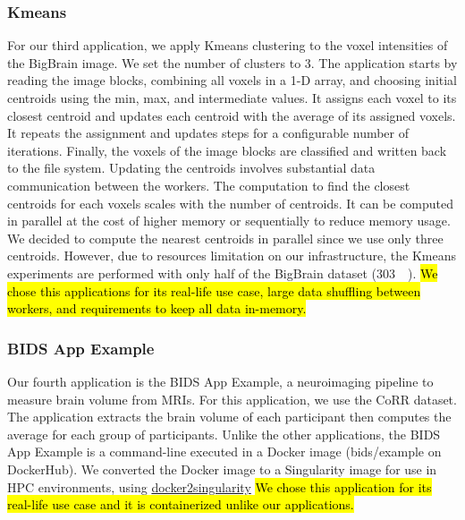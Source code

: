 \documentclass[AMA,STIX1COL]{WileyNJD-v2}
\newcommand{\HL}[1]{\hl{#1}}
\begin{document}
\subsubsection{Kmeans}
For our third application, we apply Kmeans clustering to the voxel
intensities of the BigBrain image. We set the number of clusters to 3. The
application starts by reading the image blocks, combining all voxels in a
1-D array, and choosing initial centroids using the min, max, and
intermediate values. It assigns each voxel to its closest centroid and
updates each centroid with the average of its assigned voxels. It repeats
the assignment and updates steps for a configurable number of iterations.
Finally, the voxels of the image blocks are classified and written back to
the file system. Updating the centroids involves substantial data
communication between the workers.
The computation to find the closest centroids for each voxels scales with the number of centroids.
It can be computed in parallel at the cost of higher memory or sequentially to reduce memory usage.
We decided to compute the nearest centroids in parallel since we use only three centroids.
However, due to resources limitation on our infrastructure, the Kmeans experiments
are performed with only half of the BigBrain dataset ({\SI{303}{\gibi\byte}}).
\HL{We chose this applications for its real-life use case, large data shuffling between workers,
and requirements to keep all data in-memory.}
								
\subsubsection{BIDS App Example}
Our fourth application is the BIDS App Example, a neuroimaging pipeline to
measure brain volume from MRIs. For this application, we use the CoRR
dataset. The application extracts the brain volume of each participant
then computes the average for each group of participants. Unlike the other
applications, the BIDS App Example is a command-line executed in a Docker image
(bids/example on DockerHub). We converted the Docker image to a Singularity
image for use in HPC environments, using
\href{https://hub.docker.com/r/singularityware/docker2singularity/tags/}{docker2singularity}
\HL{We chose this application for its real-life use case and it is containerized unlike our applications.}
										
\end{document}
